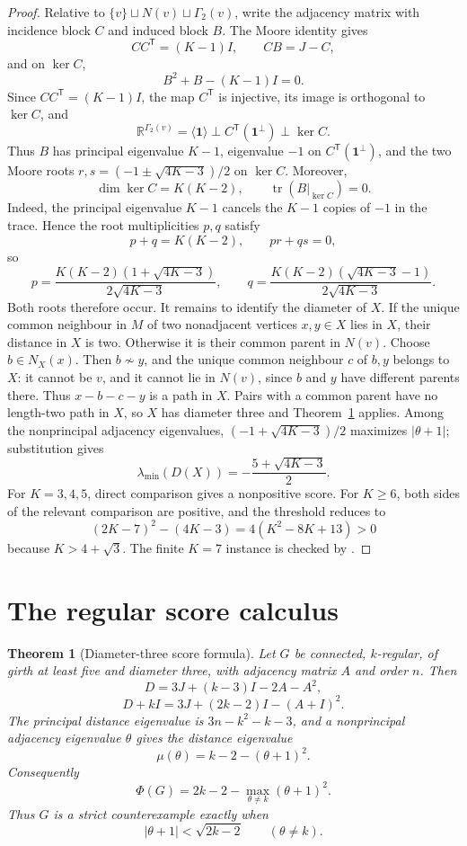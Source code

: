 \documentclass[a4paper,10pt,reqno]{amsart}
\theoremstyle{plain}
\newtheorem{theorem}{Theorem}[section]
\theoremstyle{definition}
\theoremstyle{remark}
\newcommand{\one}{\mathbf 1}
\newcommand{\tr}{\operatorname{tr}}
\newcommand{\resultbox}[1]{\boxed{#1}}
\newcommand{\RepoTag}{v2.2.6}
\newcommand{\codefile}[1]{%
  \href{https://github.com/SamPetkov/wow284/blob/\RepoTag/#1}{\path{#1}}}
\begin{document}
\begin{proof}
Relative to \(\{v\}\sqcup N(v)\sqcup\Gamma_2(v)\), write the adjacency
matrix with incidence block \(C\) and induced block \(B\).  The Moore identity
gives
\[
 CC^{\mathsf T}=(K-1)I,
 \qquad CB=J-C,
\]
and on \(\ker C\),
\[
 B^2+B-(K-1)I=0.
\]
Since \(CC^{\mathsf T}=(K-1)I\), the map \(C^{\mathsf T}\) is injective,
its image is orthogonal to \(\ker C\), and
\[
 \mathbb R^{\Gamma_2(v)}
 =\langle\one\rangle\perp C^{\mathsf T}(\one^\perp)\perp\ker C.
\]
Thus \(B\) has principal eigenvalue \(K-1\), eigenvalue \(-1\) on
\(C^{\mathsf T}(\one^\perp)\), and the two Moore roots
\(r,s=(-1\pm\sqrt{4K-3})/2\) on \(\ker C\).  Moreover,
\[
 \dim\ker C=K(K-2),\qquad \tr(B|_{\ker C})=0.
\]
Indeed, the principal eigenvalue \(K-1\) cancels the \(K-1\) copies of
\(-1\) in the trace.  Hence the root multiplicities \(p,q\) satisfy
\[
 p+q=K(K-2),\qquad pr+qs=0,
\]
so
\[
 p=\frac{K(K-2)(1+\sqrt{4K-3})}{2\sqrt{4K-3}},
 \qquad
 q=\frac{K(K-2)(\sqrt{4K-3}-1)}{2\sqrt{4K-3}}.
\]
Both roots therefore occur.  It remains to identify the
diameter of \(X\).  If the unique common neighbour in \(M\) of two
nonadjacent vertices \(x,y\in X\) lies in \(X\), their distance in \(X\)
is two.  Otherwise it is their common parent in \(N(v)\).  Choose
\(b\in N_X(x)\).  Then \(b\not\sim y\), and the unique common neighbour
\(c\) of \(b,y\) belongs to \(X\): it cannot be \(v\), and it cannot
lie in \(N(v)\), since \(b\) and \(y\) have different parents there.
Thus \(x-b-c-y\) is a path in \(X\).  Pairs with a common parent have no
length-two path in \(X\), so \(X\) has diameter three and
Theorem~\ref{thm:diameter-three-score} applies.  Among the nonprincipal
adjacency eigenvalues, \((-1+\sqrt{4K-3})/2\) maximizes
\(|\theta+1|\); substitution gives
\[
 \lambda_{\min}(D(X))=-\frac{5+\sqrt{4K-3}}2.
\]
For \(K=3,4,5\), direct comparison gives a nonpositive score.  For
\(K\ge6\), both sides of the relevant comparison are positive, and the
threshold reduces to
\[
 (2K-7)^2-(4K-3)=4(K^2-8K+13)>0
\]
because \(K>4+\sqrt3\).  The finite \(K=7\) instance is checked by
\codefile{scripts/verify_wow284_38_40_42.py}.
\end{proof}

\section{The regular score calculus}\label{sec:score-calculus}

\begin{theorem}[Diameter-three score formula]\label{thm:diameter-three-score}
Let \(G\) be connected, \(k\)-regular, of girth at least five and diameter
three, with adjacency matrix \(A\) and order \(n\).  Then
\[
 D=3J+(k-3)I-2A-A^2,
\]
\[
 D+kI=3J+(2k-2)I-(A+I)^2.
\]
The principal distance eigenvalue is \(3n-k^2-k-3\), and a nonprincipal
adjacency eigenvalue \(\theta\) gives the distance eigenvalue
\[
 \mu(\theta)=k-2-(\theta+1)^2.
\]
Consequently
\[
 \resultbox{
 \Phi(G)=2k-2-\max_{\theta\ne k}(\theta+1)^2.
 }
\]
Thus \(G\) is a strict counterexample exactly when
\[
 |\theta+1|<\sqrt{2k-2}
 \qquad(\theta\ne k).
\]
\end{theorem}
\end{document}
